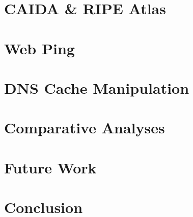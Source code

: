 \documentclass[12pt,oneside,letterpaper]{memoir}
\begin{document}
    \newpage
    \acresetall
    \chapter{CAIDA \& RIPE Atlas}\label{sec:caida}
    
    
    
    
    
    
    \newpage
    \chapter{Web Ping}\label{sec:web-ping}
    
    
    
    
    \chapter{DNS Cache Manipulation}\label{sec:dns}
    
    
    
    
    
    \newpage
    \chapter{Comparative Analyses}\label{sec:comparative_analyses}
    
    
    
    
    
    \newpage
    \chapter{Future Work}\label{sec:future_work}
    
    
    \newpage
    \chapter{Conclusion}\label{sec:conclusion}
    
    
    \newpage
    \begin{appendices}
        
        
    \end{appendices}

    
\end{document}
